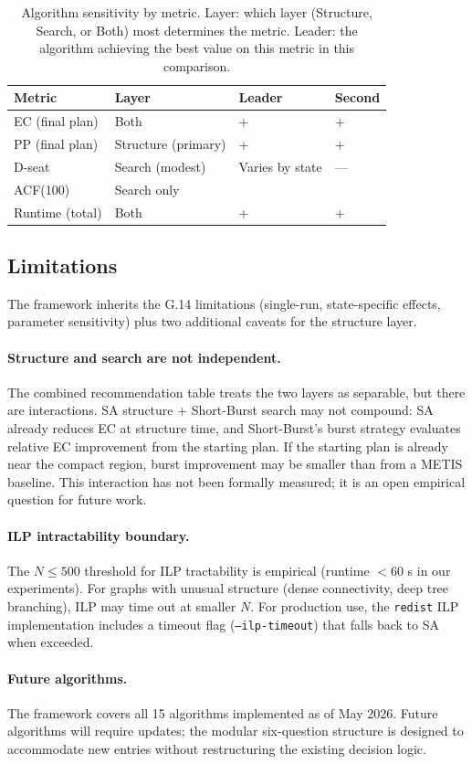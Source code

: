 \begin{table}[ht]
\centering
\caption{%
  Algorithm sensitivity by metric. Layer: which layer (Structure, Search, or Both)
  most determines the metric. Leader: the algorithm achieving the best
  value on this metric in this comparison.
}
\label{tab:sensitivity}
\begin{tabular}{@{}llll@{}}
\toprule
Metric & Layer & Leader & Second \\
\midrule
EC (final plan)   & Both & \pt{} + \sa{} & \sburst{} + \sa{} \\
PP (final plan)   & Structure (primary) & \cvdgeo{} + \smcp{} & \cvdgeo{} + \smc{} \\
D-seat            & Search (modest)     & Varies by state & --- \\
ACF(100)          & Search only         & \ams{} & \pt{} \\
Runtime (total)   & Both & \bfsgrow{} + \flip{} & \metis{} + \flip{} \\
\bottomrule
\end{tabular}
\end{table}

\subsection{Limitations}

The framework inherits the G.14 limitations (single-run, state-specific effects,
parameter sensitivity) plus two additional caveats for the structure layer.

\paragraph{Structure and search are not independent.}
The combined recommendation table treats the two layers as separable, but there
are interactions.
SA structure + Short-Burst search may not compound: SA already reduces EC at
structure time, and Short-Burst's burst strategy evaluates relative EC
improvement from the starting plan.
If the starting plan is already near the compact region, burst improvement
may be smaller than from a METIS baseline.
This interaction has not been formally measured; it is an open empirical
question for future work.

\paragraph{ILP intractability boundary.}
The $N \leq 500$ threshold for ILP tractability is empirical (runtime
$< 60$ s in our experiments).
For graphs with unusual structure (dense connectivity, deep tree branching),
ILP may time out at smaller $N$.
For production use, the \texttt{redist} ILP implementation includes a timeout
flag (\texttt{--ilp-timeout}) that falls back to SA when exceeded.

\paragraph{Future algorithms.}
The framework covers all 15 algorithms implemented as of May 2026.
Future algorithms will require updates; the modular six-question structure
is designed to accommodate new entries without restructuring the existing
decision logic.
